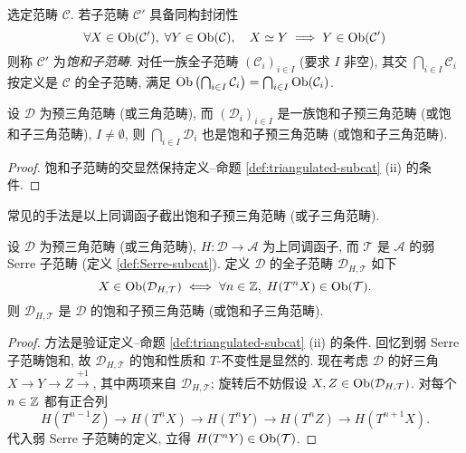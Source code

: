 \begin{convention}\label{con:saturated-intersection}
	选定范畴 $\mathcal{C}$. 若子范畴 $\mathcal{C}'$ 具备同构封闭性
	\[ \forall X \in \operatorname{Ob}(\mathcal{C}'), \; \forall Y \in \operatorname{Ob}(\mathcal{C}), \quad X \simeq Y \implies Y \in \operatorname{Ob}(\mathcal{C}') \]
	则称 $\mathcal{C}'$ 为\emph{饱和子范畴}. 对任一族全子范畴 $(\mathcal{C}_i)_{i \in I}$ (要求 $I$ 非空), 其交 $\bigcap_{i \in I} \mathcal{C}_i$ 按定义是 $\mathcal{C}$ 的全子范畴, 满足 $\operatorname{Ob}\left( \bigcap_{i \in I} \mathcal{C}_i \right) = \bigcap_{i \in I} \operatorname{Ob}(\mathcal{C}_i)$.
\end{convention}

\begin{proposition}\label{prop:triangulated-subcat-intersection}
	设 $\mathcal{D}$ 为预三角范畴 (或三角范畴), 而 $(\mathcal{D}_i)_{i \in I}$ 是一族饱和子预三角范畴 (或饱和子三角范畴), $I \neq \emptyset$, 则 $\bigcap_{i \in I} \mathcal{D}_i$ 也是饱和子预三角范畴 (或饱和子三角范畴).
\end{proposition}
\begin{proof}
	饱和子范畴的交显然保持定义--命题 \ref{def:triangulated-subcat} (ii) 的条件.
\end{proof}

常见的手法是以上同调函子截出饱和子预三角范畴 (或子三角范畴).

\begin{proposition}\label{prop:cut-subcat-by-cohomologies}
	设 $\mathcal{D}$ 为预三角范畴 (或三角范畴), $H: \mathcal{D} \to \mathcal{A}$ 为上同调函子, 而 $\mathcal{T}$ 是 $\mathcal{A}$ 的弱 Serre 子范畴 (定义 \ref{def:Serre-subcat}). 定义 $\mathcal{D}$ 的全子范畴 $\mathcal{D}_{H, \mathcal{T}}$ 如下
	\[ X \in \operatorname{Ob}(\mathcal{D}_{H, \mathcal{T}}) \iff \forall n \in \mathbb{Z}, \; H(T^n X) \in \operatorname{Ob}(\mathcal{T}). \]
	则 $\mathcal{D}_{H, \mathcal{T}}$ 是 $\mathcal{D}$ 的饱和子预三角范畴 (或饱和子三角范畴).
\end{proposition}
\begin{proof}
	方法是验证定义--命题 \ref{def:triangulated-subcat} (ii) 的条件. 回忆到弱 Serre 子范畴饱和, 故 $\mathcal{D}_{H, \mathcal{T}}$ 的饱和性质和 $T$-不变性是显然的. 现在考虑 $\mathcal{D}$ 的好三角 $X \to Y \to Z \xrightarrow{+1}$, 其中两项来自 $\mathcal{D}_{H, \mathcal{T}}$; 旋转后不妨假设 $X, Z \in \operatorname{Ob}(\mathcal{D}_{H, \mathcal{T}})$. 对每个 $n \in \mathbb{Z}$ 都有正合列
	\[ H(T^{n-1} Z) \to H(T^n X) \to H(T^n Y) \to H(T^n Z) \to H(T^{n+1} X). \]
	代入弱 Serre 子范畴的定义, 立得 $H(T^n Y) \in \operatorname{Ob}(\mathcal{T})$.
\end{proof}

